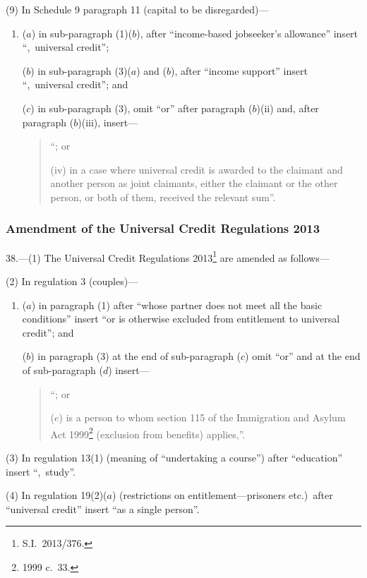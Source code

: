 \documentclass[12pt,a4paper]{article}
\begin{document}
(9) In Schedule 9 paragraph 11 (capital to be disregarded)—
\begin{enumerate}\item[]
($a$) in sub-paragraph (1)($b$), after “income-based jobseeker’s allowance” insert “,~universal credit”;

($b$) in sub-paragraph (3)($a$)  and ($b$), after “income support” insert “,~universal credit”; and

($c$) in sub-paragraph (3), omit “or” after paragraph ($b$)(ii)  and, after paragraph ($b$)(iii), insert—
\begin{quotation}
“; or

(iv) in a case where universal credit is awarded to the claimant and another person as joint claimants, either the claimant or the other person, or both of them, received the relevant sum”.
\end{quotation}
\end{enumerate}

\subsubsection[38. Amendment of the Universal Credit Regulations 2013]{Amendment of the Universal Credit Regulations 2013}

38.—(1) The Universal Credit Regulations 2013\footnote{S.I.~2013/376.} are amended as follows—

(2) In regulation 3 (couples)—
\begin{enumerate}\item[]
($a$) in paragraph (1) after “whose partner does not meet all the basic conditions” insert “or is otherwise excluded from entitlement to universal credit”; and

($b$) in paragraph (3) at the end of sub-paragraph ($c$)  omit “or” and at the end of sub-paragraph ($d$)  insert—
\begin{quotation}
“; or

($e$) is a person to whom section 115 of the Immigration and Asylum Act 1999\footnote{1999 c.~33.} (exclusion from benefits) applies,”.
\end{quotation}
\end{enumerate}

(3) In regulation 13(1) (meaning of “undertaking a course”) after “education” insert “,~study”.

(4) In regulation 19(2)($a$)  (restrictions on entitlement---prisoners etc.)\ after “universal credit” insert “as a single person”.
\end{document}

